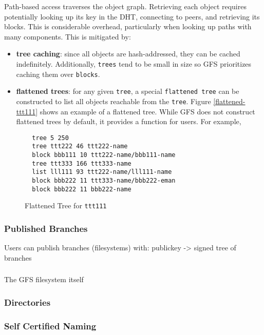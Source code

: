 \documentclass{sig-alternate}
\begin{document}
Path-based access traverses the object graph. Retrieving
each object requires potentially looking up its key in the DHT,
connecting to peers, and retrieving its blocks. This is considerable
overhead, particularly when looking up paths with many components.
This is mitigated by:
\begin{itemize}
  \item \textbf{tree caching}: since all objects are hash-addressed, they
        can be cached indefinitely. Additionally, \texttt{trees} tend to be
        small in size so GFS prioritizes caching them over \texttt{blocks}.
  \item \textbf{flattened trees}: for any given \texttt{tree}, a special
        \texttt{flattened tree} can be constructed to list all objects
        reachable from the \texttt{tree}. Figure \ref{flattened-ttt111} shows
        an example of a flattened tree. While GFS does not construct flattened
        trees by default, it provides a function for users. For example,
\end{itemize}

\begin{figure}
\begin{verbatim}
  tree 5 250
  tree ttt222 46 ttt222-name
  block bbb111 10 ttt222-name/bbb111-name
  tree ttt333 166 ttt333-name
  list lll111 93 ttt222-name/lll111-name
  block bbb222 11 ttt333-name/bbb222-eman
  block bbb222 11 bbb222-name
\end{verbatim}
\caption{Flattened Tree for \texttt{ttt111}} \label{fig:flattened-ttt111}
\end{figure}


\subsubsection{Published Branches}



Users can publish branches (filesystems) with:
publickey -> signed tree of branches

\subsubsection{}


The GFS filesystem itself


\subsubsection{Directories}


\subsubsection{Self Certified Naming}
\end{document}
